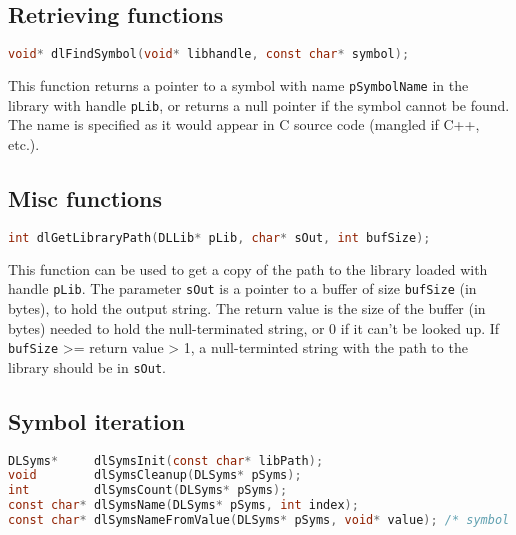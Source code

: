 \subsection{Retrieving functions}

\begin{lstlisting}[language=c]
void* dlFindSymbol(void* libhandle, const char* symbol);
\end{lstlisting}

This function returns a pointer to a symbol with name \lstinline{pSymbolName} in the
library with handle \lstinline{pLib}, or returns a null pointer if the symbol cannot
be found. The name is specified as it would appear in C source code (mangled if C++, etc.).

\subsection{Misc functions}
\begin{lstlisting}[language=c]
int dlGetLibraryPath(DLLib* pLib, char* sOut, int bufSize);
\end{lstlisting}

This function can be used to get a copy of the path to the library loaded with handle
\lstinline{pLib}. The parameter \lstinline{sOut} is a pointer to a buffer of size
\lstinline{bufSize} (in bytes), to hold the output string. The return value is the size
of the buffer (in bytes) needed to hold the null-terminated string, or 0 if it can't be
looked up. If \lstinline{bufSize} >= return value > 1, a null-terminted string with the
path to the library should be in \lstinline{sOut}.

\subsection{Symbol iteration}

\begin{lstlisting}[language=c]
DLSyms*     dlSymsInit(const char* libPath);
void        dlSymsCleanup(DLSyms* pSyms);
int         dlSymsCount(DLSyms* pSyms);
const char* dlSymsName(DLSyms* pSyms, int index);
const char* dlSymsNameFromValue(DLSyms* pSyms, void* value); /* symbol must be loaded */
\end{lstlisting}


